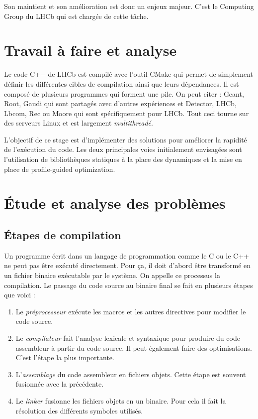 \documentclass[a4paper]{report}
\begin{document}
Son maintient et son amélioration est donc un enjeux majeur.
C'est le Computing Group du LHCb qui est chargée de cette tâche.

\section{Travail à faire et analyse}
Le code C++ de LHCb est compilé avec l'outil CMake qui permet de simplement définir les différentes cibles de compilation ainsi que leurs dépendances.
Il est composé de plusieurs programmes qui forment une pile.
On peut citer : Geant, Root, Gaudi qui sont partagés avec d'autres expériences et Detector, LHCb, Lbcom, Rec ou Moore qui sont spécifiquement pour LHCb.
Tout ceci tourne sur des serveurs Linux et est largement \emph{multithreadé}.

L'objectif de ce stage est d'implémenter des solutions pour améliorer la rapidité de l'exécution du code.
Les deux principales voies initialement envisagées sont l'utilisation de bibliothèques statiques à la place des dynamiques et la mise en place de profile-guided optimization.

\section{Étude et analyse des problèmes}

\subsection{Étapes de compilation}
Un programme écrit dans un langage de programmation comme le C ou le C++ ne peut pas être exécuté directement.
Pour ça, il doit d'abord être transformé en un fichier binaire exécutable par le système.
On appelle ce processus la compilation.
Le passage du code source au binaire final se fait en plusieurs étapes que voici :
\begin{enumerate}
    \item Le \emph{préprocesseur} exécute les macros et les autres directives pour modifier le code source.
    \item Le \emph{compilateur} fait l'analyse lexicale et syntaxique pour produire du code assembleur à partir du code source.
          Il peut également faire des optimisations.
          C'est l'étape la plus importante.
    \item L'\emph{assemblage} du code assembleur en fichiers objets.
          Cette étape est souvent fusionnée avec la précédente.
    \item Le \emph{linker} fusionne les fichiers objets en un binaire.
          Pour cela il fait la résolution des différents symboles utilisés.
\end{enumerate}
\end{document}

